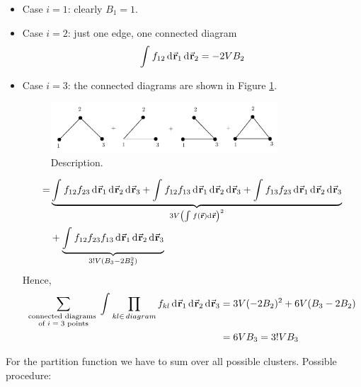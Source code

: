 \documentclass[../main/main.tex]{subfiles}
\begin{document}
\begin{itemize}
\item Case \( i=1 \): clearly  \( B_1 =1 \).
\item Case \( i=2 \): just one edge, one connected diagram
\begin{equation}
  \int_{}^{} f_{12} \dd[]{\va{r}_1} \dd[]{\va{r}_2} = - 2 V B_2
\end{equation}
\item Case \( i=3 \): the connected diagrams are shown in Figure \ref{fig:15_7}.
\begin{figure}[h!]
\centering
\includegraphics[width=0.8\textwidth]{../lessons/15_image/10.pdf}
\caption{\label{fig:15_7} Description.}
\end{figure}
\begin{equation}
\begin{split}
   = & \underbrace{ \int_{}^{} f_{12} f_{23} \dd[]{\va{r}_1} \dd[]{\va{r}_2} \dd[]{\va{r}_3}
    + \int_{}^{} f_{12}f_{13} \dd[]{\va{r}_1} \dd[]{\va{r}_2} \dd[]{\va{r}_3}
    + \int_{}^{} f_{13}f_{23} \dd[]{\va{r}_1} \dd[]{\va{r}_2} \dd[]{\va{r}_3} }_{3 V \qty(\int_{}^{} f (\va{r})\dd[]{\va{r}}  )^2 }   \\
  & + \underbrace{\int_{}^{} f_{12} f_{23} f_{13} \dd[]{\va{r}_1} \dd[]{\va{r}_2} \dd[]{\va{r}_3}}_{3! V (B_3 - 2 B_2^2)}
\end{split}
\end{equation}
Hence,
\begin{equation}
\begin{split}
  \sum_{\substack{ \text{connected diagrams } \\ \text{of \( i=3 \) points}} }^{} \int_{}^{} \prod_{kl \in \, diagram }^{} f_{kl} \dd[]{\va{r}_1}   \dd[]{\va{r}_2}    \dd[]{\va{r}_3}
  & = 3 V (-2B_2)^2 + 6V (B_3 - 2 B_2) \\
  & = 6V B_3 = 3! V B_3
\end{split}
\end{equation}

\end{itemize}
For the partition function we have to sum over all possible clusters.
Possible procedure:
\end{document}
